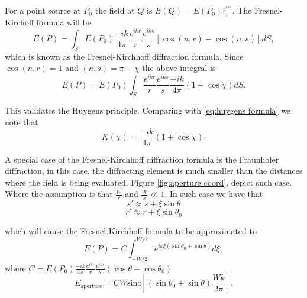 \documentclass[12pt,twoside,english]{book}
\renewcommand{\~}{\perispomeni}%
\numberwithin{equation}{section}
\numberwithin{figure}{section}
\begin{document}
For a point source at $P_{0}$ the field at $Q$ is $E\left(Q\right)=E\left(P_{0}\right)\frac{e^{iks}}{s}$.
The Fresnel-Kirchoff formula will be
\begin{equation}
E\left(P\right)=\int_{S}E\left(P_{0}\right)\frac{-ik}{4\pi}\frac{e^{ikr}}{r}\frac{e^{iks}}{s}\left[\cos\left(n,r\right)-\cos\left(n,s\right)\right]dS,
\label{eq:Fresnel-Kirchhoff}
\end{equation}
which is known as the Fresnel-Kirchhoff diffraction formula. Since $\cos\left(n,r\right)=1$ and $\left(n,s\right)=\pi-\chi$ the above integral is
\begin{equation}
E\left(P\right)=E\left(P_{0}\right)\int_{S}\frac{e^{ikr}}{r}\frac{e^{iks}}{s}\frac{-ik}{4\pi}\left(1+\cos\chi\right)dS.
\end{equation}

This validates the Huygens principle. Comparing with \ref{eq:huygens formula} we note that
\begin{equation}
K\left(\chi\right)=\frac{-ik}{4\pi}\left(1+\cos\chi\right).
\end{equation}


A special case of the Fresnel-Kirchhoff diffraction formula is the Fraunhofer diffraction, in this case, the diffracting element is much smaller than the distances where the field is being evaluated. Figure \ref{fig:aperture coord}, depict such case. Where the assumption is that $\frac{W}{r}$ and $\frac{W}{s}\ll1$. In such case we have that
\begin{equation}
s'\approx s+\xi\sin\theta
\end{equation}
\begin{equation}
r'\approx r+\xi\sin\theta_{0}
\end{equation}


which will cause the Fresnel-Kirchhoff formula to be approximated to
\begin{equation}
E\left(P\right)=C\int_{-W/2}^{W/2}e^{ik\xi\left(\sin\theta_{0}+\sin\theta\right)}d\xi,
\label{eq:Fraunhofer}
\end{equation}
where $C=E\left(P_{0}\right)\frac{-ik}{4\pi}\frac{e^{ikr}}{r}\frac{e^{iks}}{s}\left(\cos\theta-\cos\theta_{0}\right)$
\begin{equation}
E_{\text{aperture}}=CW\text{sinc}\left[\left(\sin\theta_{0}+\sin\theta\right)\frac{Wk}{2\pi}\right].
\end{equation}
\end{document}
